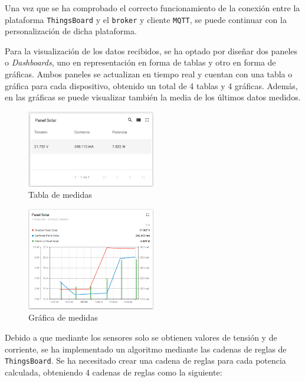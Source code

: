 Una vez que se ha comprobado el correcto funcionamiento de la conexión entre la plataforma \texttt{ThingsBoard} y el \texttt{broker} y cliente \texttt{MQTT}, se puede continuar con la personalización de dicha plataforma.

Para la visualización de los datos recibidos, se ha optado por diseñar dos paneles o \textit{Dashboards}, uno en representación en forma de tablas y otro en forma de gráficas. Ambos paneles se actualizan en tiempo real y cuentan con una tabla o gráfica para cada dispositivo, obtenido un total de 4 tablas y 4 gráficas. Además, en las gráficas se puede visualizar también la media de los últimos datos medidos.

\begin{figure}[H]
    \centering
    \includegraphics[width=0.5\textwidth]{images/3-software/3-2-2-thingsboard/TablaThingsBoard.png}
    \caption{Tabla de medidas}
    \label{fig:3-2-2-TablaThingsBoard}
\end{figure}

\begin{figure}[H]
    \centering
    \includegraphics[width=0.5\textwidth]{images/3-software/3-2-2-thingsboard/GraficaThingsBoard.png}
    \caption{Gráfica de medidas}
    \label{fig:3-2-2-GraficaThingsBoard}
\end{figure}

Debido a que mediante los sensores solo se obtienen valores de tensión y de corriente, se ha implementado un algoritmo mediante las cadenas de reglas de \texttt{ThingsBoard}. Se ha necesitado crear una cadena de reglas para cada potencia calculada, obteniendo 4 cadenas de reglas como la siguiente:

